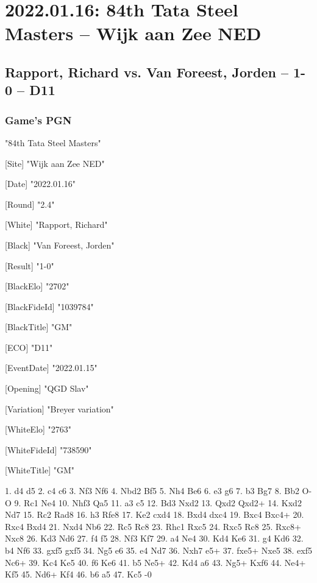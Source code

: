 \documentclass[9pt]{extarticle}
\begin{document}
\section*{2022.01.16: 84th Tata Steel Masters -- Wijk aan Zee NED}

\subsection*{Rapport, Richard vs. Van Foreest, Jorden -- 1-0 -- D11}
\subsubsection*{Game's PGN}
\begin{flushleft}
[Event] "84th Tata Steel Masters"

[Site] "Wijk aan Zee NED"

[Date] "2022.01.16"

[Round] "2.4"

[White] "Rapport, Richard"

[Black] "Van Foreest, Jorden"

[Result] "1-0"

[BlackElo] "2702"

[BlackFideId] "1039784"

[BlackTitle] "GM"

[ECO] "D11"

[EventDate] "2022.01.15"

[Opening] "QGD Slav"

[Variation] "Breyer variation"

[WhiteElo] "2763"

[WhiteFideId] "738590"

[WhiteTitle] "GM"

\end{flushleft}
\begin{flushleft}
1. d4 d5 2. c4 c6 3. Nf3 Nf6 4. Nbd2 Bf5 5. Nh4 Be6 6. e3 g6 7. b3 Bg7 8. Bb2 O-O 9. Rc1 Ne4 10. Nhf3 Qa5 11. a3 c5 12. Bd3 Nxd2 13. Qxd2 Qxd2+ 14. Kxd2 Nd7 15. Rc2 Rad8 16. h3 Rfe8 17. Ke2 cxd4 18. Bxd4 dxc4 19. Bxc4 Bxc4+ 20. Rxc4 Bxd4 21. Nxd4 Nb6 22. Rc5 Rc8 23. Rhc1 Rxc5 24. Rxc5 Rc8 25. Rxc8+ Nxc8 26. Kd3 Nd6 27. f4 f5 28. Nf3 Kf7 29. a4 Ne4 30. Kd4 Ke6 31. g4 Kd6 32. b4 Nf6 33. gxf5 gxf5 34. Ng5 e6 35. e4 Nd7 36. Nxh7 e5+ 37. fxe5+ Nxe5 38. exf5 Nc6+ 39. Kc4 Ke5 40. f6 Ke6 41. b5 Ne5+ 42. Kd4 a6 43. Ng5+ Kxf6 44. Ne4+ Kf5 45. Nd6+ Kf4 46. b6 a5 47. Kc5 \quad  {}-0
\end{flushleft}
\parindent 0mm
\end{document}
